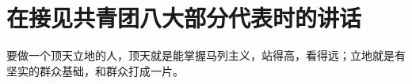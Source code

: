 \section[在接见共青团八大部分代表时的讲话（一九五七年五月二十二日）]{在接见共青团八大部分代表时的讲话}


要做一个顶天立地的人，顶天就是能掌握马列主义，站得高，看得远；立地就是有坚实的群众基础，和群众打成一片。


